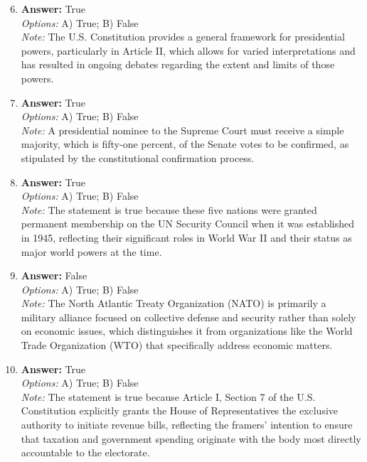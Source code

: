 \documentclass[12pt]{article}
\begin{document}
\begin{enumerate}[label=\arabic*.]
\setcounter{enumi}{5}
\item \textbf{Answer:} True
\\ \textit{Options:} A) True; B) False
\\ \textit{Note:} The U.S. Constitution provides a general framework for presidential powers, particularly in Article II, which allows for varied interpretations and has resulted in ongoing debates regarding the extent and limits of those powers.
\item \textbf{Answer:} True
\\ \textit{Options:} A) True; B) False
\\ \textit{Note:} A presidential nominee to the Supreme Court must receive a simple majority, which is fifty-one percent, of the Senate votes to be confirmed, as stipulated by the constitutional confirmation process.
\item \textbf{Answer:} True
\\ \textit{Options:} A) True; B) False
\\ \textit{Note:} The statement is true because these five nations were granted permanent membership on the UN Security Council when it was established in 1945, reflecting their significant roles in World War II and their status as major world powers at the time.
\item \textbf{Answer:} False
\\ \textit{Options:} A) True; B) False
\\ \textit{Note:} The North Atlantic Treaty Organization (NATO) is primarily a military alliance focused on collective defense and security rather than solely on economic issues, which distinguishes it from organizations like the World Trade Organization (WTO) that specifically address economic matters.
\item \textbf{Answer:} True
\\ \textit{Options:} A) True; B) False
\\ \textit{Note:} The statement is true because Article I, Section 7 of the U.S. Constitution explicitly grants the House of Representatives the exclusive authority to initiate revenue bills, reflecting the framers' intention to ensure that taxation and government spending originate with the body most directly accountable to the electorate.
\end{enumerate}
\end{document}
